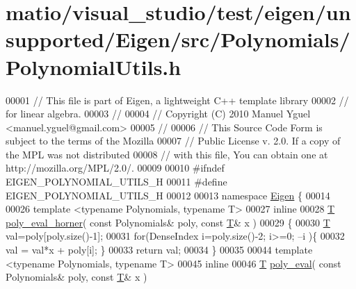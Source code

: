 \hypertarget{matio_2visual__studio_2test_2eigen_2unsupported_2_eigen_2src_2_polynomials_2_polynomial_utils_8h_source}{}\section{matio/visual\+\_\+studio/test/eigen/unsupported/\+Eigen/src/\+Polynomials/\+Polynomial\+Utils.h}
\label{matio_2visual__studio_2test_2eigen_2unsupported_2_eigen_2src_2_polynomials_2_polynomial_utils_8h_source}

\begin{DoxyCode}
00001 \textcolor{comment}{// This file is part of Eigen, a lightweight C++ template library}
00002 \textcolor{comment}{// for linear algebra.}
00003 \textcolor{comment}{//}
00004 \textcolor{comment}{// Copyright (C) 2010 Manuel Yguel <manuel.yguel@gmail.com>}
00005 \textcolor{comment}{//}
00006 \textcolor{comment}{// This Source Code Form is subject to the terms of the Mozilla}
00007 \textcolor{comment}{// Public License v. 2.0. If a copy of the MPL was not distributed}
00008 \textcolor{comment}{// with this file, You can obtain one at http://mozilla.org/MPL/2.0/.}
00009 
00010 \textcolor{preprocessor}{#ifndef EIGEN\_POLYNOMIAL\_UTILS\_H}
00011 \textcolor{preprocessor}{#define EIGEN\_POLYNOMIAL\_UTILS\_H}
00012 
00013 \textcolor{keyword}{namespace }\hyperlink{namespace_eigen}{Eigen} \{ 
00014 
00026 \textcolor{keyword}{template} <\textcolor{keyword}{typename} Polynomials, \textcolor{keyword}{typename} T>
00027 \textcolor{keyword}{inline}
00028 \hyperlink{group___sparse_core___module_class_eigen_1_1_triplet}{T} \hyperlink{namespace_eigen_aadbf059bc28ce1cf94c57c1454633d40}{poly\_eval\_horner}( \textcolor{keyword}{const} Polynomials& poly, \textcolor{keyword}{const} \hyperlink{group___sparse_core___module_class_eigen_1_1_triplet}{T}& x )
00029 \{
00030   \hyperlink{group___sparse_core___module_class_eigen_1_1_triplet}{T} val=poly[poly.size()-1];
00031   \textcolor{keywordflow}{for}(DenseIndex i=poly.size()-2; i>=0; --i )\{
00032     val = val*x + poly[i]; \}
00033   \textcolor{keywordflow}{return} val;
00034 \}
00035 
00044 \textcolor{keyword}{template} <\textcolor{keyword}{typename} Polynomials, \textcolor{keyword}{typename} T>
00045 \textcolor{keyword}{inline}
00046 \hyperlink{group___sparse_core___module_class_eigen_1_1_triplet}{T} \hyperlink{namespace_eigen_adb64ffddaa9e83634e3ab0e3fd3664f5}{poly\_eval}( \textcolor{keyword}{const} Polynomials& poly, \textcolor{keyword}{const} \hyperlink{group___sparse_core___module_class_eigen_1_1_triplet}{T}& x )

\end{DoxyCode}
